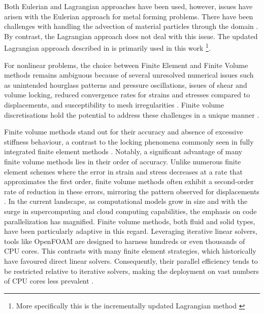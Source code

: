 \documentclass[sn-mathphys,Numbered,draft]{sn-jnl}%
\begin{document}
Both Eulerian and Lagrangian approaches have been used, however, issues have arisen with the Eulerian approach for metal forming problems. There have been challenges with handling the advection of material particles through the domain \cite{martins_extrusion_2011,basic_finite_2005}. By contrast, the Lagrangian approach does not deal with this issue. The updated Lagrangian approach described in \cite{cardiff_lagrangian_2017} is primarily used in this work \footnote{More specifically this is the incrementally updated Lagrangian method \cite{belytschko_nonlinear_2014}}.  

 For nonlinear problems, the choice between Finite Element and Finite Volume methods remains ambiguous because of several unresolved numerical issues such as unintended hourglass patterns and pressure oscillations, issues of shear and volume locking, reduced convergence rates for strains and stresses compared to displacements, and susceptibility to mesh irregularities \cite{hassan_upwind_2019}. Finite volume discretisations hold the potential to address these challenges in a unique manner \cite{cardiff_thirty_2021}.

Finite volume methods stand out for their accuracy and absence of excessive stiffness behaviour, a contrast to the locking phenomena commonly seen in fully integrated finite element methods \cite{cardiff_thirty_2021}. Notably, a significant advantage of many finite volume methods lies in their order of accuracy. Unlike numerous finite element schemes where the error in strain and stress decreases at a rate that approximates the first order, finite volume methods often exhibit a second-order rate of reduction in these errors, mirroring the pattern observed for displacements \cite{vaz_accuracy_2009}. In the current landscape, as computational models grow in size and with the surge in supercomputing and cloud computing capabilities, the emphasis on code parallelization has magnified. Finite volume methods, both fluid and solid types, have been particularly adaptive in this regard. Leveraging iterative linear solvers, tools like OpenFOAM are designed to harness hundreds or even thousands of CPU cores. This contrasts with many finite element strategies, which historically have favoured direct linear solvers. Consequently, their parallel efficiency tends to be restricted relative to iterative solvers, making the deployment on vast numbers of CPU cores less prevalent \cite{cardiff_thirty_2021}.
\end{document}
